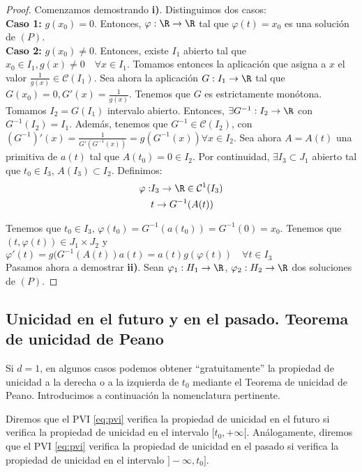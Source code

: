 \documentclass{article}
\begin{document}
\begin{proof}
  Comenzamos demostrando \textbf{i)}. Distinguimos dos casos:\\

  \textbf{Caso 1:} $g(x_0) = 0$. Entonces, $\varphi: \R \to \R$ tal que
  $\varphi(t) = x_0$ es una solución de $(P)$.\\

  \textbf{Caso 2:} $g(x_0) \neq 0$. Entonces, existe $I_1$ abierto tal que
  $x_0 \in I_1, g(x) \neq 0 \quad \forall x \in I_1$. Tomamos entonces la aplicación que asigna a
  $x$ el valor $\frac{1}{g(x)} \in \mathcal{C}(I_1)$.  Sea ahora la aplicación $ G: I_1 \to \R$ tal
  que $G(x_0) = 0, G'(x) = \frac{1}{g(x)}$.  Tenemos que $G$ es estrictamente monótona. Tomamos
  $I_2 = G(I_1)$ intervalo abierto. Entonces, $\exists G^{-1}: I_2 \to \R$ con $G^{-1}(I_2) =
  I_1$. Además, tenemos que $G^{-1} \in \mathcal{C}(I_2)$, con
  $(G^{-1})' (x) = \frac{1}{G'(G^{-1}(x))} = g(G^{-1}(x)) \forall x \in I_2$.  Sea ahora $A = A(t)$
  una primitiva de $a(t)$ tal que $A(t_0) = 0 \in I_2$.  Por continuidad, $\exists I_3 \subset J_1$
  abierto tal que $t_0 \in I_3$, $A(I_3) \subset I_2$. Definimos:
  \begin{align*}
    \varphi : & I_3 \to \R \in \mathcal{C}^1(I_3) \\
              & t \to G^{-1}(A(t))
  \end{align*}

  Tenemos que $t_0 \in I_3$, $\varphi(t_0) = G^{-1}(a(t_0)) = G^{-1}(0) = x_0$. Tenemos que
  $(t, \varphi(t)) \in J_1 \times J_2$ y
  $\varphi'(t) = g(G^{-1}(A(t))a(t) = a(t)g(\varphi(t)) \quad \forall
  t \in I_3$ \\

  Pasamos ahora a demostrar \textbf{ii)}. Sean $\varphi_1: H_1 \to \R$, $\varphi_2: H_2 \to \R$ dos
  soluciones de $(P)$.
\end{proof}

\subsection{Unicidad en el futuro y en el pasado. Teorema de unicidad de Peano}

Si $d = 1$, en algunos casos podemos obtener ``gratuitamente'' la propiedad de unicidad a la derecha
o a la izquierda de $t_0$ mediante el Teorema de unicidad de Peano. Introducimos a continuación la
nomenclatura pertinente.

\begin{definition}
  \label{def:unicidad-futuro}
  Diremos que el PVI \eqref{eq:pvi} verifica la propiedad de unicidad en el futuro si verifica la
  propiedad de unicidad en el intervalo $[t_0, +\infty[$. Análogamente, diremos que el PVI
  \eqref{eq:pvi} verifica la propiedad de unicidad en el pasado si verifica la propiedad de unicidad
  en el intervalo $]-\infty, t_0]$.
\end{definition}
\end{document}
